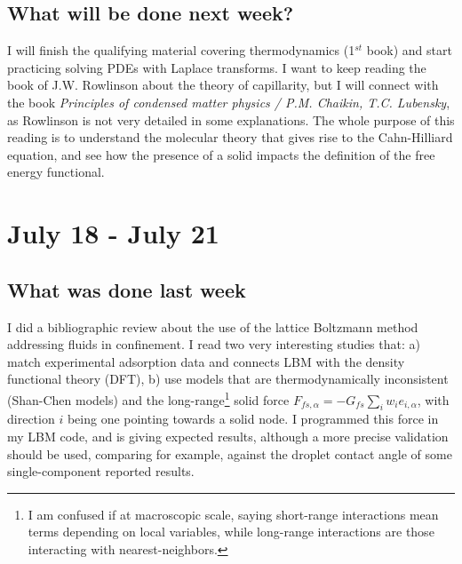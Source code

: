 \documentclass[12pt]{article}
\begin{document}
	\subsection*{What will be done next week?}
	I will finish the qualifying material covering thermodynamics (1$^{st}$ book) and start practicing solving PDEs with Laplace transforms. I want to keep reading the book of J.W. Rowlinson about the theory of capillarity, but I will connect with the book \textit{Principles of condensed matter physics / P.M. Chaikin, T.C. Lubensky}, as Rowlinson is not very detailed in some explanations. The whole purpose of this reading is to understand the molecular theory that gives rise to the Cahn-Hilliard equation, and see how the presence of a solid impacts the definition of the free energy functional.
	
	\pagebreak
	\section*{July 18 - July 21}
	\subsection*{What was done last week}
	I did a bibliographic review about the use of the lattice Boltzmann method addressing fluids in confinement. I read two very interesting studies that: a) match experimental adsorption data and connects LBM with the density functional theory (DFT), b) use models that are thermodynamically inconsistent (Shan-Chen models) and the long-range\footnote{I am confused if at macroscopic scale, saying short-range interactions mean terms depending on local variables, while long-range interactions are those interacting with nearest-neighbors.} solid force $F_{fs,\alpha} = - G_{fs} \sum_i w_i e_{i,\alpha} $, with direction $i$ being one pointing towards a solid node. I programmed this force in my LBM code, and is giving expected results, although a more precise validation should be used, comparing for example, against the droplet contact angle of some single-component reported results. 
	
\end{document}
